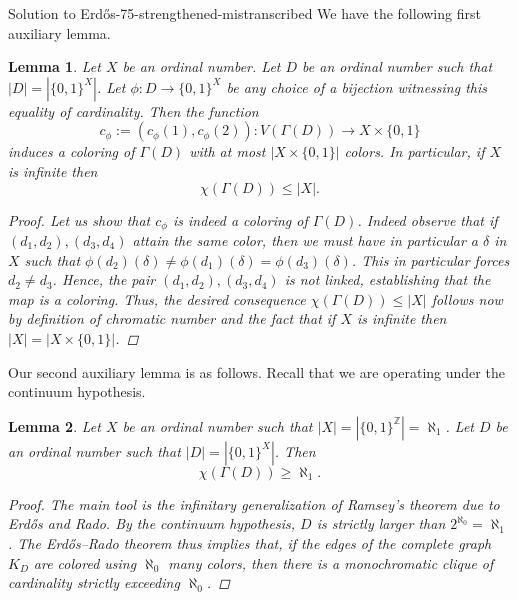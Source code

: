 \documentclass{article}
\theoremstyle{plain}
\newtheorem{lemma}{Lemma}
\theoremstyle{definition}
\begin{document}
\begin{solution}{Solution to Erd\H{o}s-75-strengthened-mistranscribed}
We have the following first auxiliary lemma. 
\begin{lemma} \label{prop: chi le aleph1}
Let $X$ be an ordinal number. Let $D$ be an ordinal number such that $|D|=|\{0,1\}^X|$. Let $\phi:D \to \{0,1\}^X$ be any choice of a bijection witnessing this equality of cardinality. Then the function
$$c_{\phi}:=(c_{\phi}(1),c_{\phi}(2)): V(\Gamma(D)) \to X \times \{0,1\}
$$
induces a coloring of $\Gamma(D)$ with at most $|X \times \{0,1\}|$ colors. In particular, if $X$ is infinite then
$$\chi(\Gamma(D)) \leq |X|. 
$$
\begin{proof}
Let us show that $c_{\phi}$ is indeed a coloring of $\Gamma(D)$. Indeed observe that if $(d_1,d_2),(d_3,d_4)$ attain the same color, then we must have in particular a $\delta$ in $X$ such that $\phi(d_2)(\delta) \neq \phi(d_1)(\delta)=\phi(d_3)(\delta)$. This in particular forces $d_2 \neq d_3$. Hence, the pair $(d_1,d_2),(d_3,d_4)$ is not linked, establishing that the map is a coloring. Thus, the desired consequence $\chi(\Gamma(D)) \leq |X|$ follows now by definition of chromatic number and the fact that if $X$ is infinite then $|X|=|X \times \{0,1\}|$.  
\end{proof}
\end{lemma}
Our second auxiliary lemma is as follows. Recall that we are operating under the continuum hypothesis.  
\begin{lemma} \label{prop: chi ge aleph1}
Let $X$ be an ordinal number such that $|X|=|\{0,1\}^{\mathbb{Z}}|=\aleph_1$. Let $D$ be an ordinal number such that $|D|=|\{0,1\}^X|$. Then
$$\chi(\Gamma(D)) \geq \aleph_1. 
$$
\begin{proof}
The main tool is the infinitary generalization of Ramsey's theorem due to Erd\H{o}s and Rado. By the continuum hypothesis, $D$ is strictly larger than $2^{\aleph_0}=\aleph_1$. The Erd\H{o}s--Rado theorem thus implies that, if the edges of the complete graph $K_D$ are colored using $\aleph_0$ many colors, then there is a monochromatic clique of cardinality strictly exceeding $\aleph_0$.


\end{proof}
\end{lemma}
\end{solution}
\end{document}
